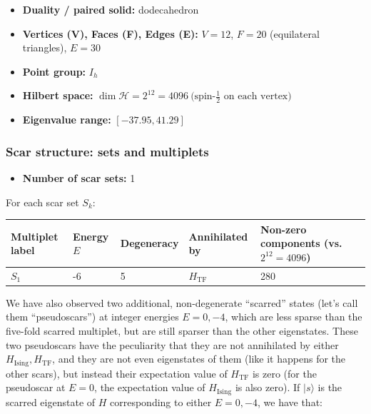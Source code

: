 \documentclass[11pt,a4paper]{article}
\newcommand{\Hising}{H_{\mathrm{Ising}}}
\newcommand{\Htf}{H_{\mathrm{TF}}}
\begin{document}
\begin{itemize}[leftmargin=1.5em]
  \item \textbf{Duality / paired solid:} dodecahedron
  \item \textbf{Vertices (V), Faces (F), Edges (E):} $V = 12$,\; $F = 20$ (equilateral triangles),\; $E = 30$
  \item \textbf{Point group:} $I_h$
  \item \textbf{Hilbert space:} \(
        \dim\mathcal{H} = 2^{12} = 4096\ \text{(spin-$\tfrac12$ on each vertex)}
        \)
  \item \textbf{Eigenvalue range:} $[-37.95, 41.29]$
\end{itemize}

\subsubsection*{Scar structure: sets and multiplets}

\begin{itemize}[leftmargin=1.5em]
  \item \textbf{Number of scar sets:} 1
  \end{itemize}
  \hspace{6mm}For each scar set $S_k$:\\

\begin{center}
\begin{tabular}{L{3.5cm} C{2.2cm} C{2.2cm} C{2.2cm} C{3.0cm} C{3.2cm}}
\toprule
\textbf{Multiplet label} & \textbf{Energy $E$} & \textbf{Degeneracy} & \textbf{Annihilated by} & \textbf{Non-zero components (vs.\ $2^{12} = 4096$)} \\
\midrule
$S_1$ & -6 & 5 & $\Htf$ & 280 \\
\bottomrule
\end{tabular}
\end{center}
  
\noindent *We have also observed two additional, non-degenerate ``scarred'' states (let's call them ``pseudoscars'') at integer energies $E=0,-4$, which are less sparse than the five-fold scarred multiplet, but are still sparser than the other eigenstates. These two pseudoscars have the peculiarity that they are not annihilated by either $\Hising , \Htf$, and they are not even eigenstates of them (like it happens for the other scars), but instead their expectation value of  $\Htf$ is zero (for the pseudoscar at $E=0$, the expectation value of $\Hising$ is also zero). If $|s\rangle$ is the scarred eigenstate of $H$ corresponding to either $E=0,-4$, we have that:
\end{document}
